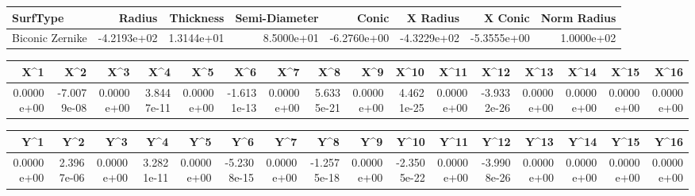 \documentclass[varwidth=\maxdimen, convert={convertexe={magick.exe}}]{standalone}
\begin{document}
\begin{tabular}{lrrrrrrr}
\toprule
       SurfType &      Radius &  Thickness &  Semi-Diameter &       Conic &    X Radius &     X Conic &  Norm Radius \\
\midrule
Biconic Zernike & -4.2193e+02 & 1.3144e+01 &     8.5000e+01 & -6.2760e+00 & -4.3229e+02 & -5.3555e+00 &   1.0000e+02 \\
\bottomrule
\end{tabular}

\begin{tabular}{rrrrrrrrrrrrrrrr}
\toprule
       X\textasciicircum 1 &         X\textasciicircum 2 &        X\textasciicircum 3 &        X\textasciicircum 4 &        X\textasciicircum 5 &         X\textasciicircum 6 &        X\textasciicircum 7 &        X\textasciicircum 8 &        X\textasciicircum 9 &       X\textasciicircum 10 &       X\textasciicircum 11 &        X\textasciicircum 12 &       X\textasciicircum 13 &       X\textasciicircum 14 &       X\textasciicircum 15 &       X\textasciicircum 16 \\
\midrule
0.0000e+00 & -7.0079e-08 & 0.0000e+00 & 3.8447e-11 & 0.0000e+00 & -1.6131e-13 & 0.0000e+00 & 5.6335e-21 & 0.0000e+00 & 4.4621e-25 & 0.0000e+00 & -3.9332e-26 & 0.0000e+00 & 0.0000e+00 & 0.0000e+00 & 0.0000e+00 \\
\bottomrule
\end{tabular}

\begin{tabular}{rrrrrrrrrrrrrrrr}
\toprule
       Y\textasciicircum 1 &        Y\textasciicircum 2 &        Y\textasciicircum 3 &        Y\textasciicircum 4 &        Y\textasciicircum 5 &         Y\textasciicircum 6 &        Y\textasciicircum 7 &         Y\textasciicircum 8 &        Y\textasciicircum 9 &        Y\textasciicircum 10 &       Y\textasciicircum 11 &        Y\textasciicircum 12 &       Y\textasciicircum 13 &       Y\textasciicircum 14 &       Y\textasciicircum 15 &       Y\textasciicircum 16 \\
\midrule
0.0000e+00 & 2.3967e-06 & 0.0000e+00 & 3.2821e-11 & 0.0000e+00 & -5.2308e-15 & 0.0000e+00 & -1.2575e-18 & 0.0000e+00 & -2.3505e-22 & 0.0000e+00 & -3.9908e-26 & 0.0000e+00 & 0.0000e+00 & 0.0000e+00 & 0.0000e+00 \\
\bottomrule
\end{tabular}
\end{document}
